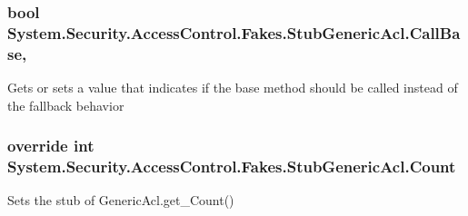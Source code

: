 \hypertarget{class_system_1_1_security_1_1_access_control_1_1_fakes_1_1_stub_generic_acl_a60c8507b4791f556a73c1ba8e704f8b3}{
\subsubsection[{Call\-Base}]{\setlength{\rightskip}{0pt plus 5cm}bool System.\-Security.\-Access\-Control.\-Fakes.\-Stub\-Generic\-Acl.\-Call\-Base\hspace{0.3cm}{\ttfamily [get]}, {\ttfamily [set]}}}\label{class_system_1_1_security_1_1_access_control_1_1_fakes_1_1_stub_generic_acl_a60c8507b4791f556a73c1ba8e704f8b3}


Gets or sets a value that indicates if the base method should be called instead of the fallback behavior

\hypertarget{class_system_1_1_security_1_1_access_control_1_1_fakes_1_1_stub_generic_acl_aee6c7c276c1fa3e899d2985d2c31850c}{
\subsubsection[{Count}]{\setlength{\rightskip}{0pt plus 5cm}override int System.\-Security.\-Access\-Control.\-Fakes.\-Stub\-Generic\-Acl.\-Count\hspace{0.3cm}{\ttfamily [get]}}}\label{class_system_1_1_security_1_1_access_control_1_1_fakes_1_1_stub_generic_acl_aee6c7c276c1fa3e899d2985d2c31850c}


Sets the stub of Generic\-Acl.\-get\-\_\-\-Count()


